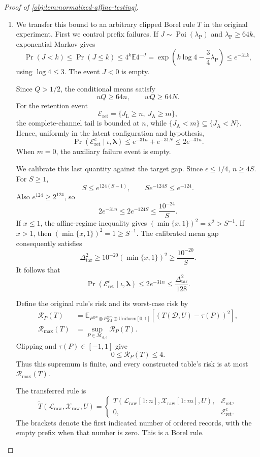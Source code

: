 \begin{proof}[Proof of \cref{obj:lem:normalized-affine-testing}]
\begin{enumerate}
\item
We transfer this bound to an arbitrary clipped Borel rule \(T\) in the original experiment. First we control prefix failures. If
\(J\sim\operatorname{Poi}(\lambda_{\mathrm P})\) and
\(\lambda_{\mathrm P}\ge64k\), exponential Markov gives
\[
\Pr(J<k)
\le\Pr(J\le k)
\le4^k\mathbb E4^{-J}
=\exp\left(k\log4-\frac34\lambda_{\mathrm P}\right)
\le e^{-31k},
\]
using \(\log4\le3\). The event \(J<0\) is empty.

Since \(Q>1/2\), the conditional means satisfy
\[
uQ\ge64n,\qquad wQ\ge64N.
\]
For the retention event
\[
\mathcal E_{\mathrm{ret}}=\{J_{\mathrm L}\ge n,\ J_{\mathrm A}\ge m\},
\]
the complete-channel tail is bounded at \(n\), while
\(\{J_{\mathrm A}<m\}\subseteq\{J_{\mathrm A}<N\}\). Hence, uniformly in the latent configuration and hypothesis,
\[
\Pr(\mathcal E_{\mathrm{ret}}^c\mid\iota,\boldsymbol\lambda)
\le e^{-31n}+e^{-31N}\le2e^{-31n}.
\]
When \(m=0\), the auxiliary failure event is empty.

We calibrate this last quantity against the target gap. Since
\(\epsilon\le1/4\), \(n\ge4S\). For \(S\ge1\),
\[
S\le e^{124(S-1)},
\qquad
Se^{-124S}\le e^{-124}.
\]
Also \(e^{124}\ge2^{124}\), so
\[
2e^{-31n}\le2e^{-124S}\le\frac{10^{-24}}{S}.
\]
If \(x\le1\), the affine-regime inequality gives
\((\min\{x,1\})^2=x^2>S^{-1}\). If \(x>1\), then
\((\min\{x,1\})^2=1\ge S^{-1}\). The calibrated mean gap consequently satisfies
\[
\Delta_{\mathrm{tar}}^2
\ge10^{-20}(\min\{x,1\})^2
\ge\frac{10^{-20}}S.
\]
It follows that
\[
\Pr(\mathcal E_{\mathrm{ret}}^c\mid\iota,\boldsymbol\lambda)
\le2e^{-31n}
\le\frac{\Delta_{\mathrm{tar}}^2}{128}.
\]

Define the original rule's risk and its worst-case risk by
\[
\begin{aligned}
\mathcal R_P(T)
&=\mathbb E_{P^{\otimes n}\otimes P_{XA}^{\otimes m}
                  \otimes\mathrm{Uniform}[0,1]}
  [(T(\mathcal D,U)-\tau(P))^2],\\
\mathcal R_{\max}(T)
&=\sup_{P\in\mathcal M_{d,\epsilon}}\mathcal R_P(T).
\end{aligned}
\]
Clipping and \(\tau(P)\in[-1,1]\) give
\[
0\le\mathcal R_P(T)\le4.
\]
Thus this supremum is finite, and every constructed table's risk is at most \(\mathcal R_{\max}(T)\).

The transferred rule is
\[
\widetilde T(\mathcal L_{\mathrm{raw}},\mathcal X_{\mathrm{raw}},U)
=
\begin{cases}
T(\mathcal L_{\mathrm{raw}}[1:n],
  \mathcal X_{\mathrm{raw}}[1:m],U),
&\mathcal E_{\mathrm{ret}},\\
0,&\mathcal E_{\mathrm{ret}}^c.
\end{cases}
\]
The brackets denote the first indicated number of ordered records, with the empty prefix when that number is zero. This is a Borel rule.


\end{enumerate}
\end{proof}
